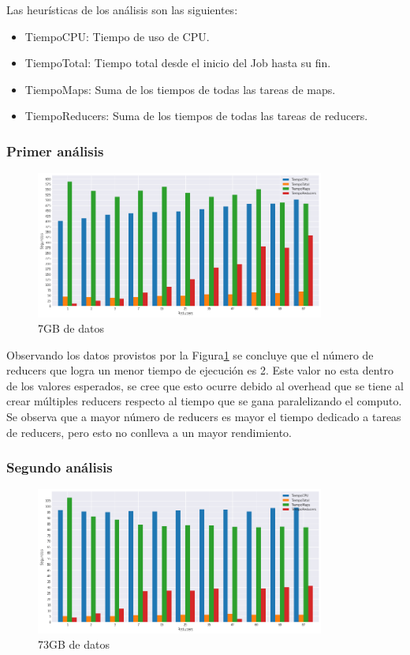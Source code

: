 \documentclass[conference]{IEEEtran}
\begin{document}
Las heurísticas de los análisis son las siguientes:
\begin{itemize}
    \item TiempoCPU: Tiempo de uso de CPU.
    \item TiempoTotal: Tiempo total desde el inicio del Job hasta su fin.
    \item TiempoMaps: Suma de los tiempos de todas las tareas de maps.
    \item TiempoReducers: Suma de los tiempos de todas las tareas de reducers.
\end{itemize}

\subsubsection{Primer análisis}\label{AA}

\begin{figure}[htbp]
\centerline{\includegraphics[width=95mm]{Pictures/Test7GB.png}}
\caption{7GB de datos}
\label{fig7GB}
\end{figure}

Observando los datos provistos por la Figura\ref{fig7GB} se concluye que el número de reducers que logra un menor tiempo de ejecución es 2. Este valor no esta dentro de los valores esperados, se cree que esto ocurre debido al overhead que se tiene al crear múltiples reducers respecto al tiempo que se gana paralelizando el computo.
Se observa que a mayor número de reducers es mayor el tiempo dedicado a tareas de reducers, pero esto no conlleva a un mayor rendimiento.

\subsubsection{Segundo análisis}\label{AA}

\begin{figure}[htbp]
\centerline{\includegraphics[width=95mm]{Pictures/Test70GB.png}}
\caption{73GB de datos}
\label{fig73GB}
\end{figure}
\end{document}
